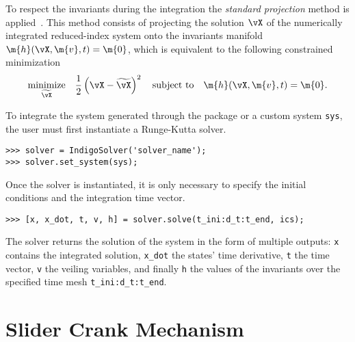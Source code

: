 To respect the invariants during the integration the \emph{standard projection} method is applied~\cite{hairer2000symmetric}. This method consists of projecting the solution $\vX$ of the numerically integrated reduced-index system onto the invariants manifold $\m{h}(\vX, \m{v}, t) = \m{0}$, which is equivalent to the following constrained minimization
%
\begin{equation}
  \underset{\widetilde{\vX}}{\textrm{minimize}} \quad \dfrac{1}{2}\left(\vX - \widetilde{\vX}\right)^2
    \quad \textrm{subject to} \quad
    \m{h}(\vX, \m{v}, t) = \m{0}.
\end{equation}

To integrate the system generated through the \Matlab{} package or a custom system \texttt{sys}, the user must first instantiate a \Indigo{} Runge-Kutta solver.
%
\begin{verbatim}
>>> solver = IndigoSolver('solver_name');
>>> solver.set_system(sys);
\end{verbatim}
%
Once the solver is instantiated, it is only necessary to specify the initial conditions and the integration time vector.
%
\begin{verbatim}
>>> [x, x_dot, t, v, h] = solver.solve(t_ini:d_t:t_end, ics);
\end{verbatim}
%
The solver returns the solution of the system in the form of multiple outputs: \texttt{x} contains the integrated solution, \texttt{x\_dot} the states' time derivative, \texttt{t} the time vector, \texttt{v} the veiling variables, and finally \texttt{h} the values of the invariants over the specified time mesh \texttt{t\_ini:d\_t:t\_end}.


\section{Slider Crank Mechanism}
\label{chap6:sec:experiment}

